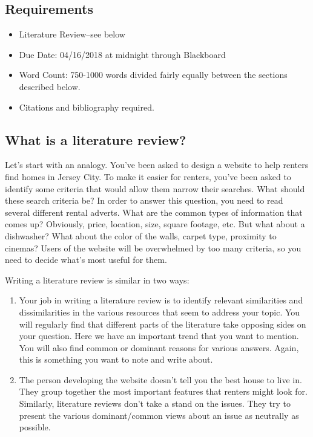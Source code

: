 \documentclass[oneside]{article}
\begin{document}
\thispagestyle{fancy}

\subsection*{Requirements}

\begin{itemize}
\item
  Literature Review--see below
\item
  Due Date: 04/16/2018 at midnight through Blackboard
\item
  Word Count: 750-1000 words divided fairly equally between the sections
  described below.
\item
  Citations and bibliography required.
\end{itemize}



\subsection*{What is a literature
review?}\label{what-is-a-literature-review}

Let's start with an analogy. You've been asked to design a website to
help renters find homes in Jersey City. To make it easier for renters,
you've been asked to identify some criteria that would allow them narrow
their searches. What should these search criteria be? In order to answer
this question, you need to read several different rental adverts. What
are the common types of information that comes up? Obviously, price,
location, size, square footage, etc. But what about a dishwasher? What
about the color of the walls, carpet type, proximity to cinemas? Users
of the website will be overwhelmed by too many criteria, so you need to
decide what's most useful for them.

Writing a literature review is similar in two ways:

\begin{enumerate}
\def\labelenumi{\arabic{enumi}.}
\itemsep1pt\parskip0pt
\item
  Your job in writing a literature review is to identify relevant
  similarities and dissimilarities in the various resources that seem to
  address your topic. You will regularly find that different parts of
  the literature take opposing sides on your question. Here we have an
  important trend that you want to mention. You will also find common or
  dominant reasons for various answers. Again, this is something you
  want to note and write about.
\item
  The person developing the website doesn't tell you the best house to
  live in. They group together the most important features that renters
  might look for. Similarly, literature reviews don't take a stand on
  the issues. They try to present the various dominant/common views
  about an issue as neutrally as possible.
\end{enumerate}
\end{document}
